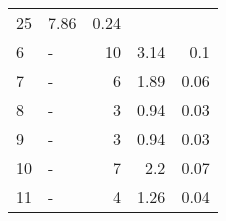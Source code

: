 \begin{longtable}{lXrrr}
       \num{25} &
       \num[round-mode=places,round-precision=2]{7.86} &
         \num[round-mode=places,round-precision=2]{0.24} \\

     6 &
     \multicolumn{1}{X}{ -  } &


       \num{10} &
       \num[round-mode=places,round-precision=2]{3.14} &
         \num[round-mode=places,round-precision=2]{0.1} \\

     7 &
     \multicolumn{1}{X}{ -  } &


       \num{6} &
       \num[round-mode=places,round-precision=2]{1.89} &
         \num[round-mode=places,round-precision=2]{0.06} \\

     8 &
     \multicolumn{1}{X}{ -  } &


       \num{3} &
       \num[round-mode=places,round-precision=2]{0.94} &
         \num[round-mode=places,round-precision=2]{0.03} \\

     9 &
     \multicolumn{1}{X}{ -  } &


       \num{3} &
       \num[round-mode=places,round-precision=2]{0.94} &
         \num[round-mode=places,round-precision=2]{0.03} \\

     10 &
     \multicolumn{1}{X}{ -  } &


       \num{7} &
       \num[round-mode=places,round-precision=2]{2.2} &
         \num[round-mode=places,round-precision=2]{0.07} \\

     11 &
     \multicolumn{1}{X}{ -  } &


       \num{4} &
       \num[round-mode=places,round-precision=2]{1.26} &
         \num[round-mode=places,round-precision=2]{0.04} \\


\end{longtable}
